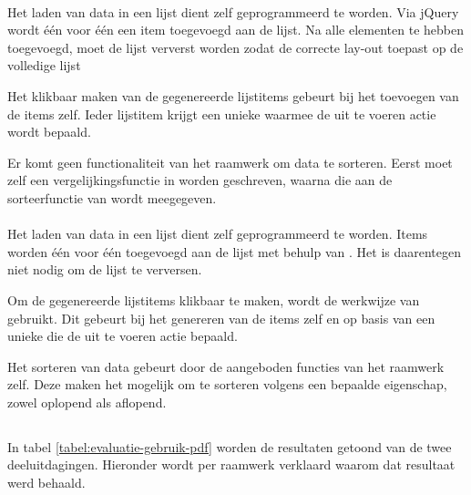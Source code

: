 \paragraph{\jqm}
Het laden van data in een lijst dient zelf geprogrammeerd te worden.
Via jQuery wordt één voor één een item toegevoegd aan de lijst.
Na alle elementen te hebben toegevoegd, moet de lijst ververst worden zodat \jqm{} de correcte lay-out toepast op de volledige lijst

Het klikbaar maken van de gegenereerde lijstitems gebeurt bij het toevoegen van de items zelf.
Ieder lijstitem krijgt een unieke  waarmee de uit te voeren actie wordt bepaald.

Er komt geen functionaliteit van het raamwerk om data te sorteren.
Eerst moet zelf een vergelijkingsfunctie in \js{} worden geschreven, waarna die aan de sorteerfunctie van \js{} wordt meegegeven.

\paragraph{\lungo}
Het laden van data in een lijst dient zelf geprogrammeerd te worden.
Items worden één voor één toegevoegd aan de lijst met behulp van \quo{}.
Het is daarentegen niet nodig om de lijst te verversen.

Om de gegenereerde lijstitems klikbaar te maken, wordt de werkwijze van \jqm{} gebruikt.
Dit gebeurt bij het genereren van de items zelf en op basis van een unieke  die de uit te voeren actie bepaald.

Het sorteren van data gebeurt door de aangeboden functies van het raamwerk zelf.
Deze maken het mogelijk om te sorteren volgens een bepaalde eigenschap, zowel oplopend als aflopend.


\subsection{}
\label{sec:evaluatie-gebruik-pdf}

In tabel \ref{tabel:evaluatie-gebruik-pdf} worden de resultaten getoond van de twee deeluitdagingen.
Hieronder wordt per raamwerk verklaard waarom dat resultaat werd behaald.

